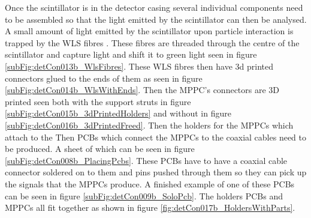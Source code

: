 Once the scintillator is in the detector casing several individual components need to be assembled so that the light emitted by the scintillator can then be analysed. A small amount of light emitted by the scintillator upon particle interaction is trapped by the WLS fibres . These fibres are threaded through the centre of the scintillator and capture light and shift it to green light seen in figure \ref{subFig:detCon013b_WlsFibres}. These WLS fibres then have 3d printed connectors glued to the ends of them as seen in figure \ref{subFig:detCon014b_WlsWithEnds}. Then the MPPC's connectors are 3D printed seen both with the support struts in figure \ref{subFig:detCon015b_3dPrintedHolders} and without in figure \ref{subFig:detCon016b_3dPrintedFreed}. Then the holders for the MPPCs which attach to the Then PCBs which connect the MPPCs to the coaxial cables need to be produced. A sheet of which can be seen in figure \ref{subFig:detCon008b_PlacingPcbs}. These PCBs have to have a coaxial cable connector soldered on to them and pins pushed through them so they can pick up the signals that the MPPCs produce. A finished example of one of these PCBs can be seen in figure \ref{subFig:detCon009b_SoloPcb}. The holders PCBs and MPPCs all fit together as shown in figure \ref{fig:detCon017b_HoldersWithParts}.

